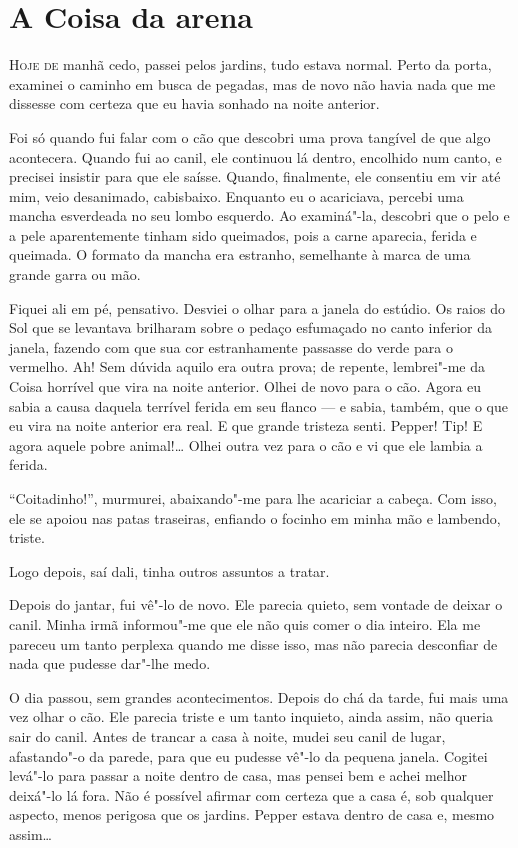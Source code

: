 \clearpage

\chapter{A Coisa da arena}

\textsc{Hoje de} manhã cedo, passei pelos jardins, tudo estava normal. Perto da porta, examinei o caminho em busca de
pegadas, mas de novo não havia nada que me dissesse com certeza que eu havia sonhado na noite anterior.

Foi só quando fui falar com o cão que descobri uma prova tangível de que algo acontecera. Quando fui ao canil, ele
continuou lá dentro, encolhido num canto, e precisei insistir para que ele saísse. Quando, finalmente, ele consentiu em
vir até mim, veio desanimado, cabisbaixo. Enquanto eu o acariciava, percebi uma mancha esverdeada no seu lombo
esquerdo. Ao examiná"-la, descobri que o pelo e a pele aparentemente tinham sido queimados, pois a carne aparecia,
ferida e queimada. O formato da mancha era estranho, semelhante à marca de uma grande garra ou mão.

Fiquei ali em pé, pensativo. Desviei o olhar para a janela do estúdio. Os raios do Sol que se levantava brilharam sobre
o pedaço esfumaçado no canto inferior da janela, fazendo com que sua cor estranhamente passasse do verde para o
vermelho. Ah! Sem dúvida aquilo era outra prova; de repente, lembrei"-me da Coisa horrível que vira na noite
anterior. Olhei de novo para o cão. Agora eu sabia a causa daquela terrível ferida em seu flanco --- e sabia, também, que
o que eu vira na noite anterior era real. E que grande tristeza senti. Pepper! Tip! E agora aquele pobre animal!\ldots{} Olhei
outra vez para o cão e vi que ele lambia a ferida.

``Coitadinho!'', murmurei, abaixando"-me para lhe acariciar a cabeça. Com isso, ele se apoiou nas patas traseiras,
enfiando o focinho em minha mão e lambendo, triste.

Logo depois, saí dali, tinha outros assuntos a tratar.

Depois do jantar, fui vê"-lo de novo. Ele parecia quieto, sem vontade de deixar o canil. Minha irmã informou"-me que
ele não quis comer o dia inteiro. Ela me pareceu um tanto perplexa quando me disse isso, mas não parecia desconfiar de
nada que pudesse dar"-lhe medo.

O dia passou, sem grandes acontecimentos. Depois do chá da tarde, fui mais uma vez olhar o cão. Ele parecia triste e um
tanto inquieto, ainda assim, não queria sair do canil. Antes de trancar a casa à noite, mudei seu canil de lugar,
afastando"-o da parede, para que eu pudesse vê"-lo da pequena janela. Cogitei levá"-lo para passar a noite dentro de
casa, mas pensei bem e achei melhor deixá"-lo lá fora. Não é possível afirmar com certeza que a casa é, sob qualquer
aspecto, menos perigosa que os jardins. Pepper estava dentro de casa e, mesmo assim\ldots{}

